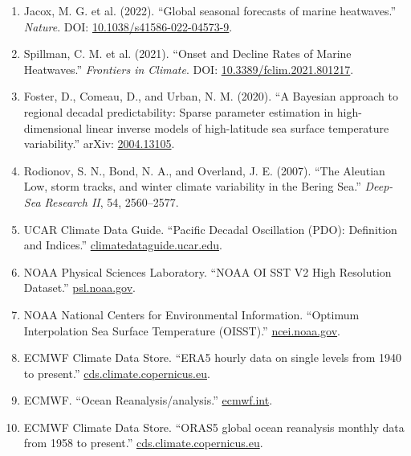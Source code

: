 \documentclass[11pt]{article}
\begin{document}
\begin{enumerate}[label={\arabic*.},leftmargin=2em]
  \item Jacox, M. G. et al. (2022). ``Global seasonal forecasts of marine heatwaves.'' \emph{Nature}. DOI: \href{https://doi.org/10.1038/s41586-022-04573-9}{10.1038/s41586-022-04573-9}.
  \item Spillman, C. M. et al. (2021). ``Onset and Decline Rates of Marine Heatwaves.'' \emph{Frontiers in Climate}. DOI: \href{https://doi.org/10.3389/fclim.2021.801217}{10.3389/fclim.2021.801217}.
  \item Foster, D., Comeau, D., and Urban, N. M. (2020). ``A Bayesian approach to regional decadal predictability: Sparse parameter estimation in high-dimensional linear inverse models of high-latitude sea surface temperature variability.'' arXiv: \href{https://arxiv.org/abs/2004.13105}{2004.13105}.
  \item Rodionov, S. N., Bond, N. A., and Overland, J. E. (2007). ``The Aleutian Low, storm tracks, and winter climate variability in the Bering Sea.'' \emph{Deep-Sea Research II}, 54, 2560--2577.
  \item UCAR Climate Data Guide. ``Pacific Decadal Oscillation (PDO): Definition and Indices.'' \href{https://climatedataguide.ucar.edu/climate-data/pacific-decadal-oscillation-pdo-definition-and-indices}{climatedataguide.ucar.edu}.
  \item NOAA Physical Sciences Laboratory. ``NOAA OI SST V2 High Resolution Dataset.'' \href{https://psl.noaa.gov/data/gridded/data.noaa.oisst.v2.highres.html}{psl.noaa.gov}.
  \item NOAA National Centers for Environmental Information. ``Optimum Interpolation Sea Surface Temperature (OISST).'' \href{https://www.ncei.noaa.gov/products/optimum-interpolation-sst}{ncei.noaa.gov}.
  \item ECMWF Climate Data Store. ``ERA5 hourly data on single levels from 1940 to present.'' \href{https://cds.climate.copernicus.eu/datasets/reanalysis-era5-single-levels}{cds.climate.copernicus.eu}.
  \item ECMWF. ``Ocean Reanalysis/analysis.'' \href{https://www.ecmwf.int/en/research/climate-reanalysis/ocean-reanalysis}{ecmwf.int}.
  \item ECMWF Climate Data Store. ``ORAS5 global ocean reanalysis monthly data from 1958 to present.'' \href{https://cds.climate.copernicus.eu/datasets/reanalysis-oras5}{cds.climate.copernicus.eu}.
\end{enumerate}
\end{document}
